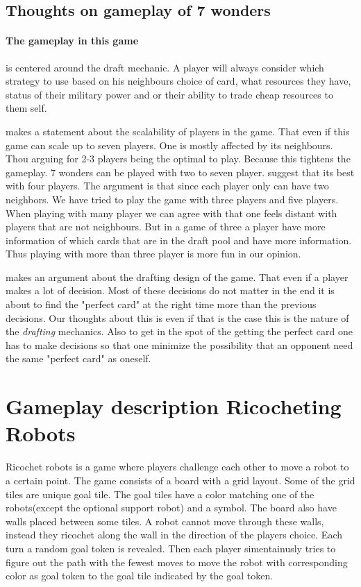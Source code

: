 \documentclass[a4paper]{article}
\begin{document}
\subsection{Thoughts on gameplay of 7 wonders}
\label{sec:thoughtsGP7wond}
\paragraph{The gameplay in this game} is centered around the draft mechanic. A player will always consider which strategy to use based on his neighbours choice of card, what resources they have, status of their military power and or their ability to trade cheap resources to them self. 

 makes a statement about the scalability of players in the game. That even if this game can scale up to seven players. One is mostly affected by its neighbours. Thou arguing for 2-3 players being the optimal to play. Because this tightens the gameplay. 
7 wonders can be played with two to seven player.  suggest that its best with four players. The argument is that since each player only can have two neighbors. We have tried to play the game with three players and five players. When playing with many player we can agree with \citeauthor{critical7wond} that one feels distant with players that are not neighbours. But in a game of three a player have more information of which cards that are in the draft pool and have more information. Thus playing with more than three player is more fun in our opinion.

 makes an argument about the drafting design of the game. That even if a player makes a lot of decision. Most of these decisions do not matter in the end it is about to find the "perfect card" at the right time more than the previous decisions. Our thoughts about this is even if that is the case this is the nature of the \textit{drafting} mechanics. Also to get in the spot of the getting the perfect card one has to make decisions so that one minimize the possibility that an opponent need the same "perfect card" as oneself.



\section{Gameplay description Ricocheting Robots}
Ricochet robots is a game where players challenge each other to move a robot to a certain point. The game consists of a board with a grid layout. Some of the grid tiles are unique goal tile. The goal tiles have a color matching one of the robots(except the optional support robot) and a symbol. The board also have walls placed between some tiles. A robot cannot move through these walls, instead they ricochet along the wall in the direction of the players choice. Each turn a random goal token is revealed. Then each player simentainusly tries to figure out the path with the fewest moves to move the robot with corresponding color as goal token to the goal tile indicated by the goal token. 
\end{document}
